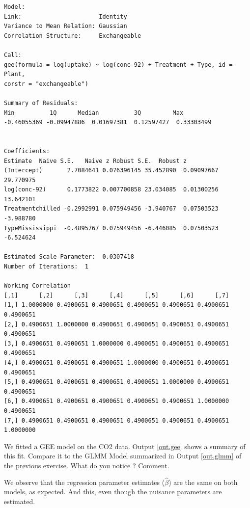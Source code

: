 \documentclass[11pt,a4paper%
addpoints, 
answers%
]{exam}
\begin{document}
\begin{questions}
\begin{center}
\begin{verbatim}
Model:
Link:                      Identity 
Variance to Mean Relation: Gaussian 
Correlation Structure:     Exchangeable 

Call:
gee(formula = log(uptake) ~ log(conc-92) + Treatment + Type, id = Plant, 
corstr = "exchangeable")

Summary of Residuals:
Min          1Q      Median          3Q         Max 
-0.46055369 -0.09947886  0.01697381  0.12597427  0.33303499 


Coefficients:
Estimate  Naive S.E.   Naive z Robust S.E.  Robust z
(Intercept)       2.7084641 0.076396145 35.452890  0.09097667 29.770975
log(conc-92)      0.1773822 0.007700858 23.034085  0.01300256 13.642101
Treatmentchilled -0.2992991 0.075949456 -3.940767  0.07503523 -3.988780
TypeMississippi  -0.4895767 0.075949456 -6.446085  0.07503523 -6.524624

Estimated Scale Parameter:  0.0307418
Number of Iterations:  1

Working Correlation
[,1]      [,2]      [,3]      [,4]      [,5]      [,6]      [,7]
[1,] 1.0000000 0.4900651 0.4900651 0.4900651 0.4900651 0.4900651 0.4900651
[2,] 0.4900651 1.0000000 0.4900651 0.4900651 0.4900651 0.4900651 0.4900651
[3,] 0.4900651 0.4900651 1.0000000 0.4900651 0.4900651 0.4900651 0.4900651
[4,] 0.4900651 0.4900651 0.4900651 1.0000000 0.4900651 0.4900651 0.4900651
[5,] 0.4900651 0.4900651 0.4900651 0.4900651 1.0000000 0.4900651 0.4900651
[6,] 0.4900651 0.4900651 0.4900651 0.4900651 0.4900651 1.0000000 0.4900651
[7,] 0.4900651 0.4900651 0.4900651 0.4900651 0.4900651 0.4900651 1.0000000
	\end{verbatim}
\end{center}

\question[1] We fitted a GEE model on the CO2 data. Output \ref{out.gee} shows a summary of this fit. Compare it to the GLMM Model summarized in Output \ref{out.glmm} of the previous exercise. What do you notice ? Comment. 

\begin{solution}
We observe that the regression parameter estimates ($\hat{\beta}$) are the same on both models, as expected. And this, even though the nuisance parameters are estimated.
\end{solution}

\end{questions}




\end{document}
